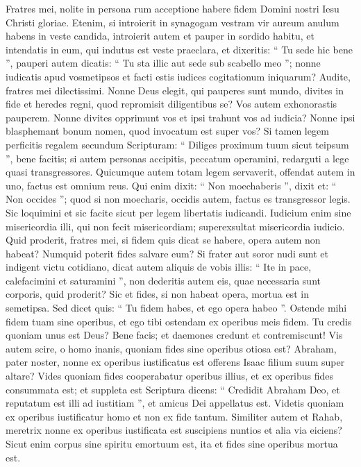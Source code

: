 \begin{biblechapter}
\begin{biblechapter}
\verse Fratres mei, nolite in persona rum acceptione habere fidem Domini nostri Iesu Christi gloriae. 
\verse Etenim, si introierit in synagogam vestram vir aureum anulum habens in veste candida, introierit autem et pauper in sordido habitu, 
\verse et intendatis in eum, qui indutus est veste praeclara, et dixeritis: “ Tu sede hic bene ”, pauperi autem dicatis: “ Tu sta illic aut sede sub scabello meo ”; 
\verse nonne iudicatis apud vosmetipsos et facti estis iudices cogitationum iniquarum?
 \verse Audite, fratres mei dilectissimi. Nonne Deus elegit, qui pauperes sunt mundo, divites in fide et heredes regni, quod repromisit diligentibus se? 
\verse Vos autem exhonorastis pauperem. Nonne divites opprimunt vos et ipsi trahunt vos ad iudicia? 
\verse Nonne ipsi blasphemant bonum nomen, quod invocatum est super vos? 
 \verse Si tamen legem perficitis regalem secundum Scripturam: “ Diliges proximum tuum sicut teipsum ”, bene facitis; 
\verse si autem personas accipitis, peccatum operamini, redarguti a lege quasi transgressores. 
\verse Quicumque autem totam legem servaverit, offendat autem in uno, factus est omnium reus. 
\verse Qui enim dixit: “ Non moechaberis ”, dixit et: “ Non occides ”; quod si non moecharis, occidis autem, factus es transgressor legis. 
\verse Sic loquimini et sic facite sicut per legem libertatis iudicandi. 
\verse Iudicium enim sine misericordia illi, qui non fecit misericordiam; superexsultat misericordia iudicio.
 \verse Quid proderit, fratres mei, si fidem quis dicat se habere, opera autem non habeat? Numquid poterit fides salvare eum? 
\verse Si frater aut soror nudi sunt et indigent victu cotidiano, 
\verse dicat autem aliquis de vobis illis: “ Ite in pace, calefacimini et saturamini ”, non dederitis autem eis, quae necessaria sunt corporis, quid proderit? 
\verse Sic et fides, si non habeat opera, mortua est in semetipsa. 
\verse Sed dicet quis: “ Tu fidem habes, et ego opera habeo ”. Ostende mihi fidem tuam sine operibus, et ego tibi ostendam ex operibus meis fidem. 
\verse Tu credis quoniam unus est Deus? Bene facis; et daemones credunt et contremiscunt! 
\verse Vis autem scire, o homo inanis, quoniam fides sine operibus otiosa est? 
\verse Abraham, pater noster, nonne ex operibus iustificatus est offerens Isaac filium suum super altare? 
\verse Vides quoniam fides cooperabatur operibus illius, et ex operibus fides consummata est; 
\verse et suppleta est Scriptura dicens: “ Credidit Abraham Deo, et reputatum est illi ad iustitiam ”, et amicus Dei appellatus est. 
\verse Videtis quoniam ex operibus iustificatur homo et non ex fide tantum. 
\verse Similiter autem et Rahab, meretrix nonne ex operibus iustificata est suscipiens nuntios et alia via eiciens? 
\verse Sicut enim corpus sine spiritu emortuum est, ita et fides sine operibus mortua est.
 

\end{biblechapter}
\end{biblechapter}

